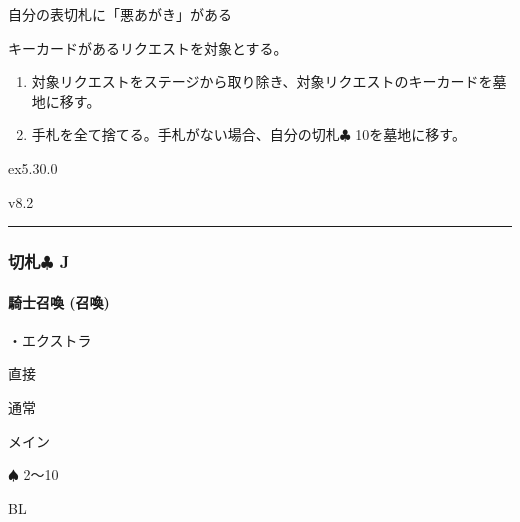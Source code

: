 \documentclass[letterpaper,10pt,dvipdfmx]{sphinxmanual}
\begin{document}
\sphinxAtStartPar
{}

\sphinxAtStartPar
自分の表切札に「悪あがき」がある

\sphinxAtStartPar
{}

\sphinxAtStartPar
キーカードがあるリクエストを対象とする。

\sphinxAtStartPar
{}
\begin{enumerate}
%
\item {} 
\sphinxAtStartPar
対象リクエストをステージから取り除き、対象リクエストのキーカードを墓地に移す。

\item {} 
\sphinxAtStartPar
手札を全て捨てる。手札がない場合、自分の切札{\normalsize $\clubsuit$} 10を墓地に移す。

\end{enumerate}

\sphinxAtStartPar
{}  ex5.30.0

\sphinxAtStartPar
{}  v8.2


\bigskip\hrule\bigskip



\subsubsection{切札{\normalsize $\clubsuit$} J}
\label{\detokenize{auto/frameActionlist:id80}}

\paragraph{騎士召喚 (召喚)}
\label{\detokenize{auto/frameActionlist:act-summonknight}}\label{\detokenize{auto/frameActionlist:id81}}
\sphinxAtStartPar
{}

\sphinxAtStartPar
・エクストラ

\sphinxAtStartPar
{} 直接

\sphinxAtStartPar
{} 通常

\sphinxAtStartPar
{} メイン

\sphinxAtStartPar
{} {\normalsize $\spadesuit$} 2〜10

\sphinxAtStartPar
{} BL

\sphinxAtStartPar
{}
\end{document}

